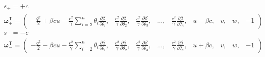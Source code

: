 \documentclass[12pt]{article}
\newcommand{\pd}[2]{\frac{\partial #1}{\partial #2}}
\newcommand{\bvec}[1]{\boldsymbol{\mathbf{#1}}}
\newcommand{\tr}{\mathsf{T}}
\begin{document}
\begin{gather*}
s_{+} = +c\\
\bvec \omega^\tr_{+} = 
\begin{pmatrix}
- \frac{q^2}{2} + \beta c u - \frac{c^2}{\gamma} 
\sum_{i=2}^n \theta_i \pd{\beta}{\theta_i}
,&
\frac{c^2}{\gamma}\pd{\beta}{\theta_2},&
\frac{c^2}{\gamma}\pd{\beta}{\theta_3},&
\dots,&
\frac{c^2}{\gamma}\pd{\beta}{\theta_n},&
u - \beta c, & v, & w, & -1
\end{pmatrix}\\
s_{-} = -c\\
\bvec \omega^\tr_{-} = 
\begin{pmatrix}
- \frac{q^2}{2} - \beta c u - \frac{c^2}{\gamma} 
\sum_{i=2}^n \theta_i \pd{\beta}{\theta_i}
,&
\frac{c^2}{\gamma}\pd{\beta}{\theta_2},&
\frac{c^2}{\gamma}\pd{\beta}{\theta_3},&
\dots,&
\frac{c^2}{\gamma}\pd{\beta}{\theta_n},&
u + \beta c, & v, & w, & -1
\end{pmatrix}
\end{gather*}
\end{document}
